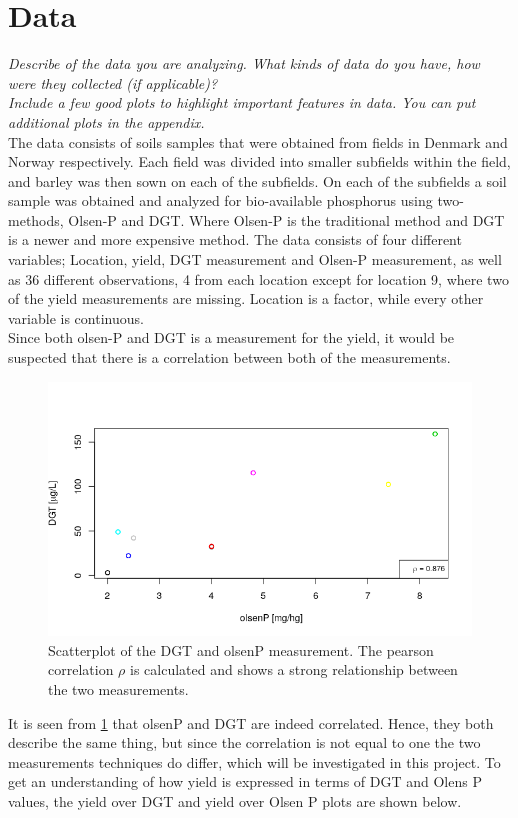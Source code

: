 \documentclass[11pt, fleqn, titlepage]{article}
\begin{document}
\section{Data}
\textit{Describe of the data you are analyzing. What kinds of data do you have, how were they collected (if applicable)? \\ Include a few good plots to highlight important features in data. You can put additional plots in the appendix.}\\
\noindent
The data consists of soils samples that were obtained from fields in Denmark and Norway respectively. Each field was divided into smaller subfields within the field, and barley was then sown on each of the subfields. On each of the subfields a soil sample was obtained and analyzed for bio-available phosphorus using two-methods, Olsen-P and DGT. Where Olsen-P is the traditional method and DGT is a newer and more expensive method. The data consists of four different variables; Location, yield, DGT measurement and Olsen-P measurement, as well as 36 different observations, 4 from each location except for location 9, where two of the yield measurements are missing. Location is a factor, while every other variable is continuous.
\\ \noindent 
Since both olsen-P and DGT is a measurement for the yield, it would be suspected that there is a correlation between both of the measurements. 
\begin{figure}[H]
	\centering
	\includegraphics[width=0.7\linewidth]{billeder/dgtolsencor.png}
	\caption{Scatterplot of the DGT and olsenP measurement. The pearson correlation $ \rho $ is calculated and shows a strong relationship between the two measurements.}
	\label{fig:dgtolsencor}
\end{figure}
\noindent It is seen from \ref{fig:dgtolsencor} that olsenP and DGT are indeed correlated. Hence, they both describe the same thing, but since the correlation is not equal to one the two measurements techniques do differ, which will be investigated in this project. To get an understanding of how yield is expressed in terms of DGT and Olens P values, the yield over DGT and yield over Olsen P plots are shown below. 
\end{document}

